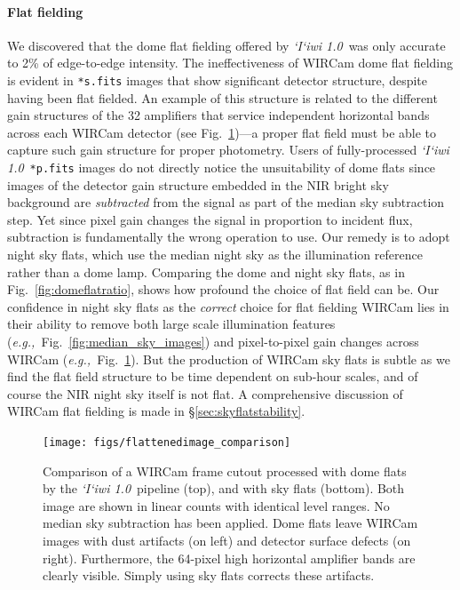 \documentclass[iop]{emulateapj}
\newcommand{\eg}{\textit{e.g.,~}}
\newcommand{\sw}[1]{\textit{#1}} %
\newcommand{\iiwione}{\sw{`I`iwi 1.0}}
\newcommand{\Fig}[1]{Fig.~\ref{fig:#1}}  %
\newcommand{\Sec}[1]{\S\ref{sec:#1}}  %
\begin{document}
\paragraph{Flat fielding} We discovered that the dome flat fielding offered by \iiwione\ was only accurate to 2\% of edge-to-edge intensity.
The ineffectiveness of WIRCam dome flat fielding is evident in \texttt{*s.fits} images that show significant detector structure, despite having been flat fielded.
An example of this structure is related to the different gain structures of the 32 amplifiers that service independent horizontal bands across each WIRCam detector (see \Fig{flattenedimage_comparison})---a proper flat field must be able to capture such gain structure for proper photometry.
Users of fully-processed \iiwione\ \texttt{*p.fits} images do not directly notice the unsuitability of dome flats since images of the detector gain structure embedded in the NIR bright sky background are \textit{subtracted} from the signal as part of the median sky subtraction step.
Yet since pixel gain changes the signal in proportion to incident flux, subtraction is fundamentally the wrong operation to use.
Our remedy is to adopt night sky flats, which use the median night sky as the illumination reference rather than a dome lamp.
Comparing the dome and night sky flats, as in \Fig{domeflatratio}, shows how profound the choice of flat field can be.
Our confidence in night sky flats as the \textit{correct} choice for flat fielding WIRCam lies in their ability to remove both large scale illumination features (\eg \Fig{median_sky_images}) and pixel-to-pixel gain changes across WIRCam (\eg \Fig{flattenedimage_comparison}).
But the production of WIRCam sky flats is subtle as we find the flat field structure to be time dependent on sub-hour scales, and of course the NIR night sky itself is not flat.
A comprehensive discussion of WIRCam flat fielding is made in \Sec{skyflatstability}.

\begin{figure}[t]
\centering
\texttt{[image: figs/flattenedimage\_comparison]}
\caption{Comparison of a WIRCam frame cutout processed with dome flats by the \iiwione\ pipeline (top), and with sky flats (bottom).
Both image are shown in linear counts with identical level ranges.
No median sky subtraction has been applied.
Dome flats leave WIRCam images with dust artifacts (on left) and detector surface defects (on right). Furthermore, the 64-pixel high horizontal amplifier bands are clearly visible.
Simply using sky flats corrects these artifacts.
}
\label{fig:flattenedimage_comparison}
\end{figure}
\end{document}
